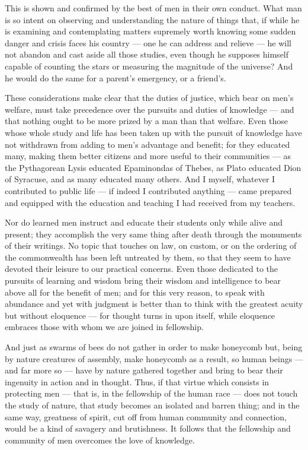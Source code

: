  This is shown and confirmed by the best of men in their own conduct. What man is so intent on observing and understanding the nature of things that, if while he is examining and contemplating matters supremely worth knowing some sudden danger and crisis faces his country — one he can address and relieve — he will not abandon and cast aside all those studies, even though he supposes himself capable of counting the stars or measuring the magnitude of the universe? And he would do the same for a parent's emergency, or a friend's.

 These considerations make clear that the duties of justice, which bear on men's welfare, must take precedence over the pursuits and duties of knowledge — and that nothing ought to be more prized by a man than that welfare. Even those whose whole study and life has been taken up with the pursuit of knowledge have not withdrawn from adding to men's advantage and benefit; for they educated many, making them better citizens and more useful to their communities — as the Pythagorean Lysis educated Epaminondas of Thebes, as Plato educated Dion of Syracuse, and as many educated many others. And I myself, whatever I contributed to public life — if indeed I contributed anything — came prepared and equipped with the education and teaching I had received from my teachers.

 Nor do learned men instruct and educate their students only while alive and present; they accomplish the very same thing after death through the monuments of their writings. No topic that touches on law, on custom, or on the ordering of the commonwealth has been left untreated by them, so that they seem to have devoted their leisure to our practical concerns. Even those dedicated to the pursuits of learning and wisdom bring their wisdom and intelligence to bear above all for the benefit of men; and for this very reason, to speak with abundance and yet with judgment is better than to think with the greatest acuity but without eloquence — for thought turns in upon itself, while eloquence embraces those with whom we are joined in fellowship.

 And just as swarms of bees do not gather in order to make honeycomb but, being by nature creatures of assembly, make honeycomb as a result, so human beings — and far more so — have by nature gathered together and bring to bear their ingenuity in action and in thought. Thus, if that virtue which consists in protecting men — that is, in the fellowship of the human race — does not touch the study of nature, that study becomes an isolated and barren thing; and in the same way, greatness of spirit, cut off from human community and connection, would be a kind of savagery and brutishness. It follows that the fellowship and community of men overcomes the love of knowledge.

